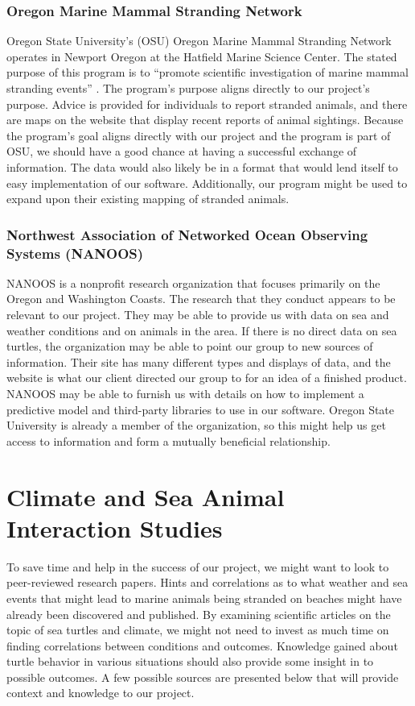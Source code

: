 \documentclass[onecolumn, draftclsnofoot,10pt, compsoc]{IEEEtran}
\begin{document}
\begin{singlespace}
\subsubsection{Oregon Marine Mammal Stranding Network}
Oregon State University's (OSU) Oregon Marine Mammal Stranding Network operates
in Newport Oregon at the Hatfield Marine Science Center. The stated purpose of this
program is to ``promote scientific investigation of marine mammal stranding events'' \cite{ommsn}.
The program's purpose aligns directly to our project's purpose. Advice is provided for
individuals to report stranded animals, and there are maps on the website that display
recent reports of animal sightings. Because the program's goal aligns directly with our
project and the program is part of OSU, we should have a good chance at having a
successful exchange of information. The data would also likely be in a format that
would lend itself to easy implementation of our software. Additionally, our program
might be used to expand upon their existing mapping of stranded animals.\cite{ommsn}
\subsubsection{Northwest Association of Networked Ocean Observing Systems (NANOOS)}
NANOOS is a nonprofit research organization that focuses primarily on the Oregon and
Washington Coasts. The research that they conduct appears to be relevant to our project. 
They may be able to provide us with data on sea and weather conditions and on animals
in the area. If there is no direct data on sea turtles, the organization may be able to point
our group to new sources of information. Their site has many different types and
displays of data, and the website is what our client directed our group to for an idea of a
finished product. NANOOS may be able to furnish us with details on how to implement
a predictive model and third-party libraries to use in our software. Oregon State
University is already a member of the organization, so this might help us get access to
information and form a mutually beneficial relationship.\cite{nanoos}
\section{Climate and Sea Animal Interaction Studies}
To save time and help in the success of our project, we might want to look to peer-reviewed
research papers. Hints and correlations as to what weather and sea events that might lead to
marine animals being stranded on beaches might have already been discovered and
published. By examining scientific articles on the topic of sea turtles and climate,
we might not need to invest as much time on finding correlations between conditions and outcomes.
Knowledge gained about turtle behavior in various situations should also provide some
insight in to possible outcomes. A few possible sources are presented below that will provide
context and knowledge to our project.

\end{singlespace}
\end{document}
